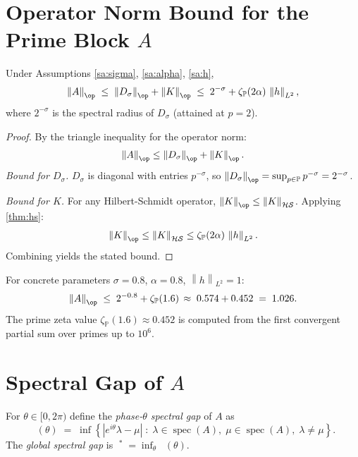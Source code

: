 \documentclass[12pt,letterpaper]{article}
\theoremstyle{definition}
\theoremstyle{remark}
\DeclareMathOperator{\spec}{spec}
\DeclareMathOperator{\sgap}{\delta_S}
\newcommand{\PP}{\mathbb{P}}
\newcommand{\HS}{\mathcal{HS}}
\newcommand{\norm}[1]{\left\|#1\right\|}
\newcommand{\abs}[1]{\left|#1\right|}
\begin{document}
\section{Operator Norm Bound for the Prime Block \texorpdfstring{$A$}{A}}
\label{app:prime-block}

\begin{apptheorem}
\label{thm:A-norm}
Under Assumptions \ref{sa:sigma}, \ref{sa:alpha}, \ref{sa:h},
\[
  \norm{A}_{\op}
  \;\leq\;
  \norm{D_\sigma}_{\op} + \norm{K}_{\op}
  \;\leq\;
  2^{-\sigma} + \zeta_\PP(2\alpha)\,\norm{h}_{L^2},
\]
where $2^{-\sigma}$ is the spectral radius of $D_\sigma$ (attained at $p=2$).
\end{apptheorem}

\begin{proof}
By the triangle inequality for the operator norm:
\[
  \norm{A}_{\op} \leq \norm{D_\sigma}_{\op} + \norm{K}_{\op}.
\]
\textit{Bound for $D_\sigma$.}
$D_\sigma$ is diagonal with entries $p^{-\sigma}$, so
$\norm{D_\sigma}_{\op} = \sup_{p \in \PP} p^{-\sigma} = 2^{-\sigma}$.

\textit{Bound for $K$.}
For any Hilbert-Schmidt operator, $\norm{K}_{\op} \leq \norm{K}_{\HS}$.
Applying \cref{thm:hs}:
\[
  \norm{K}_{\op} \leq \norm{K}_{\HS} \leq \zeta_\PP(2\alpha)\,\norm{h}_{L^2}.
\]
Combining yields the stated bound.
\end{proof}

\begin{appremark}
For concrete parameters $\sigma = 0.8$, $\alpha = 0.8$, $\norm{h}_{L^2} = 1$:
\[
  \norm{A}_{\op} \;\leq\; 2^{-0.8} + \zeta_\PP(1.6)\,
  \approx\; 0.574 + 0.452 \;=\; 1.026.
\]
The prime zeta value $\zeta_\PP(1.6) \approx 0.452$ is computed from the
first convergent partial sum over primes up to $10^6$.
\end{appremark}

\section{Spectral Gap of \texorpdfstring{$A$}{A}}
\label{app:specgap}

\begin{appdefn}
\label{defn:specgap}
For $\theta \in [0, 2\pi)$ define the \emph{phase-$\theta$ spectral gap} of
$A$ as
\[
  \sgap(\theta)
  \;=\;
  \inf\!\left\{
    \abs{e^{i\theta}\lambda - \mu}
    \;\colon\;
    \lambda \in \spec(A),\; \mu \in \spec(A),\; \lambda \neq \mu
  \right\}.
\]
The \emph{global spectral gap} is $\sgap^* = \inf_\theta \sgap(\theta)$.
\end{appdefn}
\end{document}
